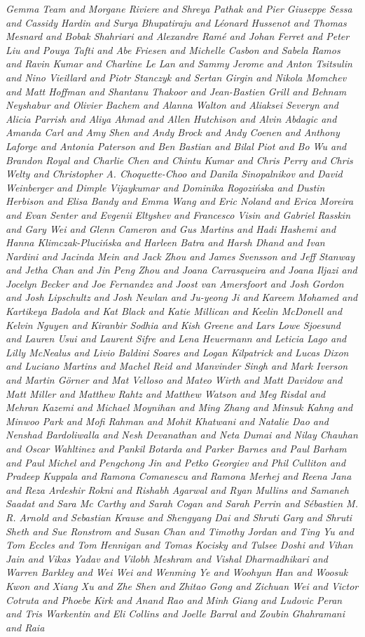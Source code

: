 \documentclass[licencjacka,en]{pracamgr}
\begin{document}
\begin{thebibliography}{199}
\textit{
Gemma Team and Morgane Riviere and Shreya Pathak and Pier Giuseppe Sessa and Cassidy Hardin and Surya Bhupatiraju and Léonard Hussenot and Thomas Mesnard and Bobak Shahriari and Alexandre Ramé and Johan Ferret and Peter Liu and Pouya Tafti and Abe Friesen and Michelle Casbon and Sabela Ramos and Ravin Kumar and Charline Le Lan and Sammy Jerome and Anton Tsitsulin and Nino Vieillard and Piotr Stanczyk and Sertan Girgin and Nikola Momchev and Matt Hoffman and Shantanu Thakoor and Jean-Bastien Grill and Behnam Neyshabur and Olivier Bachem and Alanna Walton and Aliaksei Severyn and Alicia Parrish and Aliya Ahmad and Allen Hutchison and Alvin Abdagic and Amanda Carl and Amy Shen and Andy Brock and Andy Coenen and Anthony Laforge and Antonia Paterson and Ben Bastian and Bilal Piot and Bo Wu and Brandon Royal and Charlie Chen and Chintu Kumar and Chris Perry and Chris Welty and Christopher A. Choquette-Choo and Danila Sinopalnikov and David Weinberger and Dimple Vijaykumar and Dominika Rogozińska and Dustin Herbison and Elisa Bandy and Emma Wang and Eric Noland and Erica Moreira and Evan Senter and Evgenii Eltyshev and Francesco Visin and Gabriel Rasskin and Gary Wei and Glenn Cameron and Gus Martins and Hadi Hashemi and Hanna Klimczak-Plucińska and Harleen Batra and Harsh Dhand and Ivan Nardini and Jacinda Mein and Jack Zhou and James Svensson and Jeff Stanway and Jetha Chan and Jin Peng Zhou and Joana Carrasqueira and Joana Iljazi and Jocelyn Becker and Joe Fernandez and Joost van Amersfoort and Josh Gordon and Josh Lipschultz and Josh Newlan and Ju-yeong Ji and Kareem Mohamed and Kartikeya Badola and Kat Black and Katie Millican and Keelin McDonell and Kelvin Nguyen and Kiranbir Sodhia and Kish Greene and Lars Lowe Sjoesund and Lauren Usui and Laurent Sifre and Lena Heuermann and Leticia Lago and Lilly McNealus and Livio Baldini Soares and Logan Kilpatrick and Lucas Dixon and Luciano Martins and Machel Reid and Manvinder Singh and Mark Iverson and Martin Görner and Mat Velloso and Mateo Wirth and Matt Davidow and Matt Miller and Matthew Rahtz and Matthew Watson and Meg Risdal and Mehran Kazemi and Michael Moynihan and Ming Zhang and Minsuk Kahng and Minwoo Park and Mofi Rahman and Mohit Khatwani and Natalie Dao and Nenshad Bardoliwalla and Nesh Devanathan and Neta Dumai and Nilay Chauhan and Oscar Wahltinez and Pankil Botarda and Parker Barnes and Paul Barham and Paul Michel and Pengchong Jin and Petko Georgiev and Phil Culliton and Pradeep Kuppala and Ramona Comanescu and Ramona Merhej and Reena Jana and Reza Ardeshir Rokni and Rishabh Agarwal and Ryan Mullins and Samaneh Saadat and Sara Mc Carthy and Sarah Cogan and Sarah Perrin and Sébastien M. R. Arnold and Sebastian Krause and Shengyang Dai and Shruti Garg and Shruti Sheth and Sue Ronstrom and Susan Chan and Timothy Jordan and Ting Yu and Tom Eccles and Tom Hennigan and Tomas Kocisky and Tulsee Doshi and Vihan Jain and Vikas Yadav and Vilobh Meshram and Vishal Dharmadhikari and Warren Barkley and Wei Wei and Wenming Ye and Woohyun Han and Woosuk Kwon and Xiang Xu and Zhe Shen and Zhitao Gong and Zichuan Wei and Victor Cotruta and Phoebe Kirk and Anand Rao and Minh Giang and Ludovic Peran and Tris Warkentin and Eli Collins and Joelle Barral and Zoubin Ghahramani and Raia }
\end{thebibliography}
\end{document}
